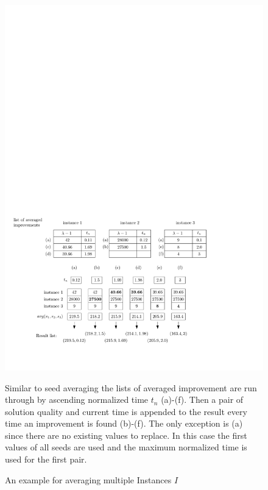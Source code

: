 \documentclass[a4paper,12pt,titlepage, BCOR7mm,headsepline]{scrbook}
\numberwithin{equation}{section}
\begin{document}
\begin{figure}[H] 
    
  \begin{center}
   \includegraphics[width=.9\textwidth]{Ipe/instanceaveragingexample.pdf}
  \caption{An example for averaging multiple Instances $I$}\label{fig:averaginginstances} %
  \end{center}
    Similar to seed averaging the lists of averaged improvement are run through by ascending normalized time $t_n$ (a)-(f). Then a pair of solution quality and current time is appended to the result every time an improvement is found (b)-(f). The only exception is (a) since there are no existing values to replace. In this case the first values of all seeds are used and the maximum normalized time is used for the first pair.
\end{figure}

\newpage
\end{document}
